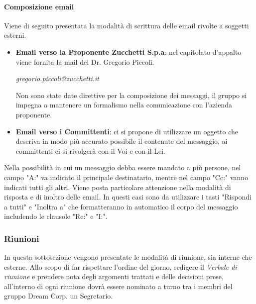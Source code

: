                 \paragraph{Composizione email}
                Viene di seguito presentata la modalità di scrittura delle email rivolte a soggetti esterni.
                \begin{itemize}
    
                    \item \textbf{Email verso la Proponente Zucchetti S.p.a}: nel capitolato d'appalto viene fornita la mail del Dr. Gregorio Piccoli.
                    \begin{center}
                        \textit{gregorio.piccoli@zucchetti.it}
                    \end{center}
                         
                    Non sono state date direttive per la composizione dei messaggi, il gruppo si impegna a mantenere un formalismo nella comunicazione con l'azienda proponente.
                    \item \textbf{Email verso i Committenti}: ci si propone di utilizzare un oggetto che descriva in modo più accurato possibile il contenute del messaggio, ai committenti ci si rivolgerà con il Voi e con il Lei.
    
                \end{itemize}
                Nella possibilità in cui un messaggio debba essere mandato a più persone, nel campo "A:" va indicato il principale destinatario, mentre nel campo "Cc:" vanno indicati tutti gli altri.
                Viene posta particolare attenzione nella modalità di risposta e di inoltro delle email. In questi casi sono da utilizzare i tasti "Rispondi a tutti" e "Inoltra a" che formatteranno in automatico il corpo del messaggio includendo le clausole "Re:" e "I:".
                \subsubsection{Riunioni}
                    In questa sottosezione vengono presentate le modalità di riunione, sia interne che esterne.
                    Allo scopo di far rispettare l'ordine del giorno, redigere il \textit{Verbale di riunione} e prendere nota degli argomenti trattati e delle decisioni prese, all'interno di ogni riunione dovrà essere nominato a turno tra i membri del gruppo Dream Corp. un Segretario.
